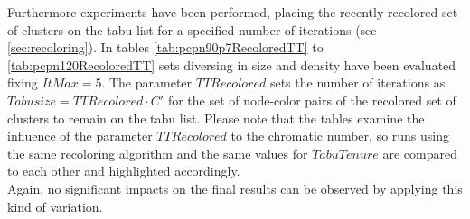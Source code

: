 Furthermore experiments have been performed, placing the recently recolored set of clusters on the tabu list for a specified number of iterations (see \ref{sec:recoloring}). In tables \ref{tab:pcpn90p7RecoloredTT} to \ref{tab:pcpn120RecoloredTT} sets diversing in size and density have been evaluated fixing $ItMax=5$. The parameter $TTRecolored$ sets the number of iterations as $Tabusize=TTRecolored\cdot C'$ for the set of node-color pairs of the recolored set of clusters to remain on the tabu list. Please note that the tables examine the influence of the parameter $TTRecolored$ to the chromatic number, so runs using the same recoloring algorithm and the same values for $TabuTenure$ are compared to each other and highlighted accordingly.\\Again, no significant impacts on the final results can be observed by applying this kind of variation.

